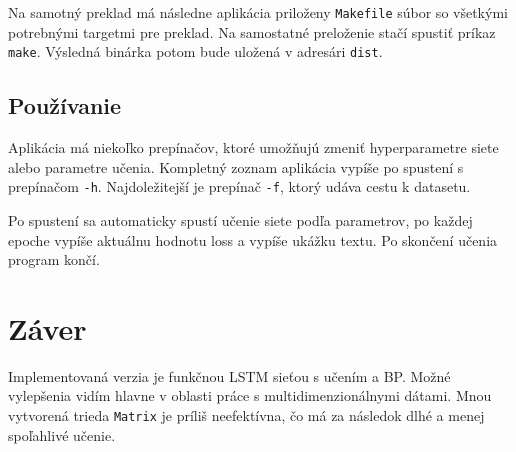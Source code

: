 \documentclass[12pt,a4paper]{article}
\begin{document}
	Na samotný preklad má následne aplikácia priloženy \texttt{Makefile} súbor so všetkými potrebnými targetmi pre preklad. Na samostatné preloženie stačí spustiť príkaz \texttt{make}. Výsledná binárka potom bude uložená v adresári \texttt{dist}.

	\subsection{Používanie}	
	Aplikácia má niekoľko prepínačov, ktoré umožňujú zmeniť hyperparametre siete alebo parametre učenia. Kompletný zoznam aplikácia vypíše po spustení s prepínačom \texttt{-h}. Najdoležitejší je prepínač \texttt{-f}, ktorý udáva cestu k datasetu.
	
	Po spustení sa automaticky spustí učenie siete podľa parametrov, po každej epoche vypíše aktuálnu hodnotu loss a vypíše ukážku textu. Po skončení učenia program končí.
	

\section{Záver}
Implementovaná verzia je funkčnou LSTM sieťou s učením a BP. Možné vylepšenia vidím hlavne v oblasti práce s multidimenzionálnymi dátami. Mnou vytvorená trieda \texttt{Matrix} je príliš neefektívna, čo má za následok dlhé a menej spoľahlivé učenie.


\end{document}
